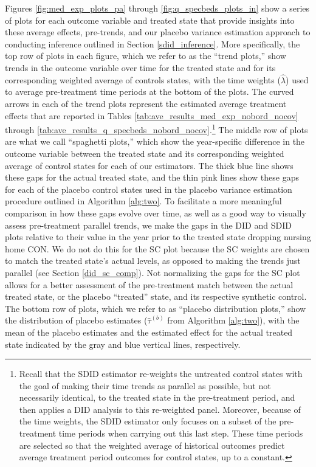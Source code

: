 \documentclass[../Main.tex]{subfiles}
\begin{document}
\indent Figures \ref{fig:med_exp_plots_pa} through \ref{fig:q_specbeds_plots_in} show a series of plots for each outcome variable and treated state that provide insights into these average effects, pre-trends, and our placebo variance estimation approach to conducting inference outlined in Section \ref{sdid_inference}. More specifically, the top row of plots in each figure, which we refer to as the ``trend plots,'' show trends in the outcome variable over time for the treated state and for its corresponding weighted average of controls states, with the time weights ($\hat{\lambda}$) used to average pre-treatment time periods at the bottom of the plots. The curved arrows in each of the trend plots represent the estimated average treatment effects that are reported in Tables \ref{tab:ave_results_med_exp_nobord_nocov} through \ref{tab:ave_results_q_specbeds_nobord_nocov}.\footnote{Recall that the SDID estimator re-weights the untreated control states with the goal of making their time trends as parallel as possible, but not necessarily identical, to the treated state in the pre-treatment period, and then applies a DID analysis to this re-weighted panel. Moreover, because of the time weights, the SDID estimator only focuses on a subset of the pre-treatment time periods when carrying out this last step. These time periods are selected so that the weighted average of historical outcomes predict average treatment period outcomes for control states, up to a constant.} The middle row of plots are what we call ``spaghetti plots,'' which show the year-specific difference in the outcome variable between the treated state and its corresponding weighted average of control states for each of our estimators. The thick blue line shows these gaps for the actual treated state, and the thin pink lines show these gaps for each of the placebo control states used in the placebo variance estimation procedure outlined in Algorithm \ref{alg:two}. To facilitate a more meaningful comparison in how these gaps evolve over time, as well as a good way to visually assess pre-treatment parallel trends, we make the gaps in the DID and SDID plots relative to their value in the year prior to the treated state dropping nursing home CON. We do not do this for the SC plot because the SC weights are chosen to match the treated state's actual levels, as opposed to making the trends just parallel (see Section \ref{did_sc_comp}). Not normalizing the gaps for the SC plot allows for a better assessment of the pre-treatment match between the actual treated state, or the placebo ``treated'' state, and its respective synthetic control. The bottom row of plots, which we refer to as ``placebo distribution plots,'' show the distribution of placebo estimates ($\hat{\tau}^{(b)}$ from Algorithm \ref{alg:two}), with the mean of the placebo estimates and the estimated effect for the actual treated state indicated by the gray and blue vertical lines, respectively.
\end{document}
